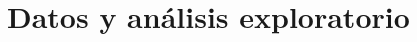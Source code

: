 \documentclass[10pt,twocolumn,a4paper]{article}
\begin{document}
\section{Datos y análisis exploratorio}


\end{document}
